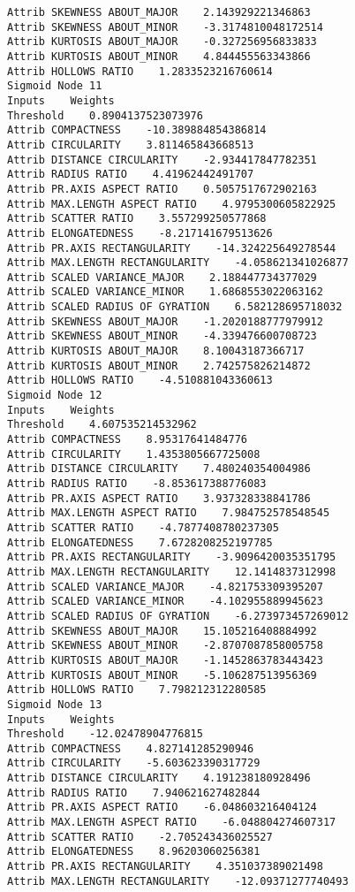 \documentclass[
	article,			%
	11pt,				%
	oneside,			%
	a4paper,			%
	english,			%
	brazil,				%
	sumario=tradicional
	]{abntex2}
\begin{document}
\begin{lstlisting}
Attrib SKEWNESS ABOUT_MAJOR    2.143929221346863
Attrib SKEWNESS ABOUT_MINOR    -3.3174810048172514
Attrib KURTOSIS ABOUT_MAJOR    -0.327256956833833
Attrib KURTOSIS ABOUT_MINOR    4.844455563343866
Attrib HOLLOWS RATIO    1.2833523216760614
Sigmoid Node 11
Inputs    Weights
Threshold    0.8904137523073976
Attrib COMPACTNESS    -10.389884854386814
Attrib CIRCULARITY    3.811465843668513
Attrib DISTANCE CIRCULARITY    -2.934417847782351
Attrib RADIUS RATIO    4.41962442491707
Attrib PR.AXIS ASPECT RATIO    0.5057517672902163
Attrib MAX.LENGTH ASPECT RATIO    4.9795300605822925
Attrib SCATTER RATIO    3.557299250577868
Attrib ELONGATEDNESS    -8.217141679513626
Attrib PR.AXIS RECTANGULARITY    -14.324225649278544
Attrib MAX.LENGTH RECTANGULARITY    -4.058621341026877
Attrib SCALED VARIANCE_MAJOR    2.188447734377029
Attrib SCALED VARIANCE_MINOR    1.6868553022063162
Attrib SCALED RADIUS OF GYRATION    6.582128695718032
Attrib SKEWNESS ABOUT_MAJOR    -1.2020188777979912
Attrib SKEWNESS ABOUT_MINOR    -4.339476600708723
Attrib KURTOSIS ABOUT_MAJOR    8.10043187366717
Attrib KURTOSIS ABOUT_MINOR    2.742575826214872
Attrib HOLLOWS RATIO    -4.510881043360613
Sigmoid Node 12
Inputs    Weights
Threshold    4.607535214532962
Attrib COMPACTNESS    8.95317641484776
Attrib CIRCULARITY    1.4353805667725008
Attrib DISTANCE CIRCULARITY    7.480240354004986
Attrib RADIUS RATIO    -8.853617388776083
Attrib PR.AXIS ASPECT RATIO    3.937328338841786
Attrib MAX.LENGTH ASPECT RATIO    7.984752578548545
Attrib SCATTER RATIO    -4.7877408780237305
Attrib ELONGATEDNESS    7.6728208252197785
Attrib PR.AXIS RECTANGULARITY    -3.9096420035351795
Attrib MAX.LENGTH RECTANGULARITY    12.1414837312998
Attrib SCALED VARIANCE_MAJOR    -4.821753309395207
Attrib SCALED VARIANCE_MINOR    -4.102955889945623
Attrib SCALED RADIUS OF GYRATION    -6.273973457269012
Attrib SKEWNESS ABOUT_MAJOR    15.105216408884992
Attrib SKEWNESS ABOUT_MINOR    -2.8707087858005758
Attrib KURTOSIS ABOUT_MAJOR    -1.1452863783443423
Attrib KURTOSIS ABOUT_MINOR    -5.106287513956369
Attrib HOLLOWS RATIO    7.798212312280585
Sigmoid Node 13
Inputs    Weights
Threshold    -12.02478904776815
Attrib COMPACTNESS    4.827141285290946
Attrib CIRCULARITY    -5.603623390317729
Attrib DISTANCE CIRCULARITY    4.191238180928496
Attrib RADIUS RATIO    7.940621627482844
Attrib PR.AXIS ASPECT RATIO    -6.048603216404124
Attrib MAX.LENGTH ASPECT RATIO    -6.048804274607317
Attrib SCATTER RATIO    -2.705243436025527
Attrib ELONGATEDNESS    8.96203060256381
Attrib PR.AXIS RECTANGULARITY    4.351037389021498
Attrib MAX.LENGTH RECTANGULARITY    -12.09371277740493

\end{lstlisting}
\end{document}
